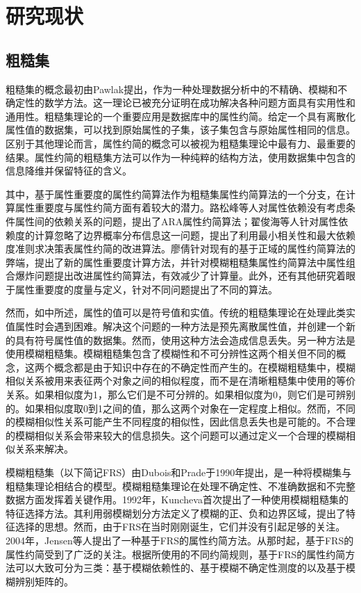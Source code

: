\section{研究现状}

\subsection{粗糙集}
粗糙集的概念最初由Pawlak\cite{pawlak1995rough}提出，作为一种处理数据分析中的不精确、模糊和不确定性的数学方法。这一理论已被充分证明在成功解决各种问题方面具有实用性和通用性\cite{1998Rough,huang1992intelligent,ziarko1994rough}。粗糙集理论的一个重要应用是数据库中的属性约简。给定一个具有离散化属性值的数据集，可以找到原始属性的子集，该子集包含与原始属性相同的信息。区别于其他理论而言，属性约简的概念可以被视为粗糙集理论中最有力、最重要的结果。属性约简的粗糙集方法可以作为一种纯粹的结构方法，使用数据集中包含的信息降维并保留特征的含义\cite{tsang2008attributes}。

其中，基于属性重要度的属性约简算法作为粗糙集属性约简算法的一个分支，在计算属性重要度与属性约简方面有着较大的潜力。路松峰等人\cite{路松峰2008}对属性依赖没有考虑条件属性间的依赖关系的问题，提出了ARA属性约简算法；翟俊海等人\cite{翟俊海2014}针对属性依赖度的计算忽略了边界概率分布信息这一问题，提出了利用最小相关性和最大依赖度准则求决策表属性约简的改进算法。廖倩\cite{基于粗糙集和模糊粗糙集的属性约简研究}针对现有的基于正域的属性约简算法的弊端，提出了新的属性重要度计算方法，并针对模糊粗糙集属性约简算法中属性组合爆炸问题提出改进属性约简算法，有效减少了计算量。此外，还有其他研究着眼于属性重要度的度量与定义，针对不同问题提出了不同的算法。

然而，如\cite{jensen2004fuzzy}中所述，属性的值可以是符号值和实值。传统的粗糙集理论在处理此类实值属性时会遇到困难。解决这个问题的一种方法是预先离散属性值\cite{1998Discretization,}，并创建一个新的具有符号属性值的数据集。然而，使用这种方法会造成信息丢失。另一种方法是使用模糊粗糙集。模糊粗糙集包含了模糊性和不可分辨性这两个相关但不同的概念，这两个概念都是由于知识中存在的不确定性而产生的。在模糊粗糙集中，模糊相似关系被用来表征两个对象之间的相似程度，而不是在清晰粗糙集中使用的等价关系。如果相似度为1，那么它们是不可分辨的。如果相似度为0，则它们是可辨别的。如果相似度取0到1之间的值，那么这两个对象在一定程度上相似。然而，不同的模糊相似性关系可能产生不同程度的相似性，因此信息丢失也是可能的。不合理的模糊相似关系会带来较大的信息损失。这个问题可以通过定义一个合理的模糊相似关系来解决。

模糊粗糙集（以下简记FRS）由Dubois和Prade\cite{dubois1990rough}于1990年提出，是一种将模糊集与粗糙集理论相结合的模型。模糊粗糙集理论在处理不确定性、不准确数据和不完整数据方面发挥着关键作用。1992年，Kuncheva\cite{KUNCHEVA1992147}首次提出了一种使用模糊粗糙集的特征选择方法。其利用弱模糊划分方法定义了模糊的正、负和边界区域，提出了特征选择的思想。然而，由于FRS在当时刚刚诞生，它们并没有引起足够的关注。2004年，Jensen等人\cite{2004Fuzzy}提出了一种基于FRS的属性约简方法。从那时起，基于FRS的属性约简受到了广泛的关注。根据所使用的不同约简规则，基于FRS的属性约简方法可以大致可分为三类：基于模糊依赖性的、基于模糊不确定性测度的以及基于模糊辨别矩阵的。

